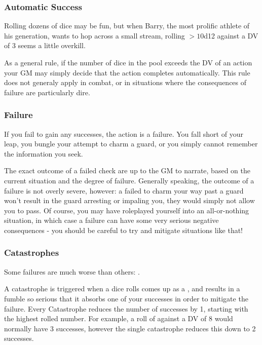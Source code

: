 \subsubsection{Automatic Success}

Rolling dozens of dice may be fun, but when Barry, the most prolific athlete of his generation, wants to hop across a small stream, rolling $>10$d12 against a DV of 3 seems a little overkill. 

As a general rule, if the number of dice in the pool exceeds the DV of an action your GM may simply decide that the action completes automatically. This rule does not generaly apply in combat, or in situations where the consequences of failure are particularly dire. 

\subsubsection{Failure}

If you fail to gain any successes, the action is a failure. You fall short of your leap, you bungle your attempt to charm a guard, or you simply cannot remember the information you seek. 

The exact outcome of a failed check are up to the GM to narrate, based on the current situation and the degree of failure. Generally speaking, the outcome of a failure is not overly severe, however: a failed  to charm your way past a guard won't result in the guard arresting or impaling you, they would simply not allow you to pass. Of course, you may have roleplayed yourself into an all-or-nothing situation, in which case a failure can have some very serious negative consequences - you should be careful to try and mitigate situations like that!

\subsubsection{Catastrophes}

Some failures are much worse than others: . 

A catastrophe is triggered when a dice rolls comes up as a , and results in a fumble so serious that it absorbs one of your successes in order to mitigate the failure. Every Catastrophe reduces the number of successes by 1, starting with the highest rolled number. For example, a roll of  against a DV of 8 would normally have 3 successes, however the single catastrophe reduces this down to 2 successes. 

